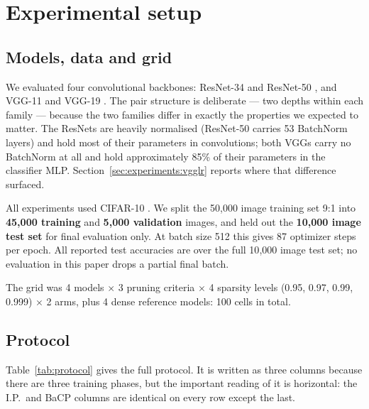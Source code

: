 \section{Experimental setup}
\label{sec:experiments}

\subsection{Models, data and grid}

We evaluated four convolutional backbones: ResNet-34 and ResNet-50
\citep{he2016deep}, and VGG-11 and VGG-19 \citep{simonyan2015very}. The pair
structure is deliberate --- two depths within each family --- because the two
families differ in exactly the properties we expected to matter. The ResNets are
heavily normalised (ResNet-50 carries 53 BatchNorm layers) and hold most of their
parameters in convolutions; both VGGs carry no BatchNorm at all and hold
approximately 85\% of their parameters in the classifier MLP. Section~\ref{sec:experiments:vgglr}
reports where that difference surfaced.

All experiments used CIFAR-10 \citep{krizhevsky2009cifar}. We split the 50{,}000
image training set 9:1 into \textbf{45{,}000 training} and \textbf{5{,}000
validation} images, and held out the \textbf{10{,}000 image test set} for final
evaluation only. At batch size 512 this gives 87 optimizer steps per epoch. All
reported test accuracies are over the full 10{,}000 image test set; no evaluation
in this paper drops a partial final batch.

The grid was 4 models $\times$ 3 pruning criteria $\times$ 4 sparsity levels
(0.95, 0.97, 0.99, 0.999) $\times$ 2 arms, plus 4 dense reference models: 100
cells in total.

\subsection{Protocol}

Table~\ref{tab:protocol} gives the full protocol. It is written as three columns
because there are three training phases, but the important reading of it is
horizontal: the I.P.\ and BaCP columns are identical on every row except the
last.

